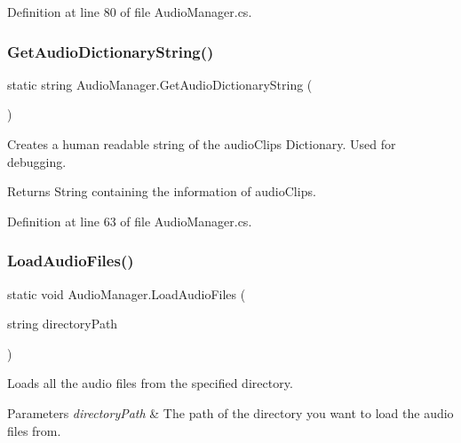 Definition at line 80 of file Audio\+Manager.\+cs.

\mbox{\label{class_audio_manager_a6299d7d95089dc7f96f3596905496b6a}} 
\subsubsection{\texorpdfstring{Get\+Audio\+Dictionary\+String()}{GetAudioDictionaryString()}}
{\footnotesize\ttfamily static string Audio\+Manager.\+Get\+Audio\+Dictionary\+String (\begin{DoxyParamCaption}{ }\end{DoxyParamCaption})\hspace{0.3cm}{\ttfamily [static]}}



Creates a human readable string of the audio\+Clips Dictionary. Used for debugging. 

\begin{DoxyReturn}{Returns}
String containing the information of audio\+Clips.
\end{DoxyReturn}


Definition at line 63 of file Audio\+Manager.\+cs.

\mbox{\label{class_audio_manager_a5f2cf46ece0d2721215fc43865ddc378}} 
\subsubsection{\texorpdfstring{Load\+Audio\+Files()}{LoadAudioFiles()}}
{\footnotesize\ttfamily static void Audio\+Manager.\+Load\+Audio\+Files (\begin{DoxyParamCaption}\item[{string}]{directory\+Path }\end{DoxyParamCaption})\hspace{0.3cm}{\ttfamily [static]}}



Loads all the audio files from the specified directory. 


\begin{DoxyParams}{Parameters}
{\em directory\+Path} & The path of the directory you want to load the audio files from.\\
\hline
\end{DoxyParams}


